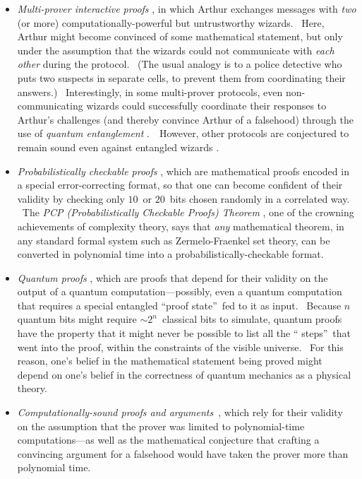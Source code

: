 \documentclass[11pt,onecolumn]{article}%
\begin{document}
\begin{itemize}
\item \textit{Multi-prover interactive proofs} \cite{bgkw,bfl}, in which
Arthur exchanges messages with \textit{two} (or more) computationally-powerful
but untrustworthy wizards. \ Here, Arthur might become convinced of some
mathematical statement, but only under the assumption that the wizards could
not communicate with \textit{each other} during the protocol. \ (The usual
analogy is to a police detective who puts two suspects in separate cells, to
prevent them from coordinating their answers.) \ Interestingly, in some
multi-prover protocols, even non-communicating wizards could successfully
coordinate their responses to Arthur's challenges (and thereby convince Arthur
of a falsehood) through the use of \textit{quantum entanglement}
\cite{chtw}.\ \ However, other protocols are conjectured to remain sound even
against entangled wizards \cite{kkmtv}.

\item \textit{Probabilistically checkable proofs} \cite{fglss,arorasafra},
which are mathematical proofs encoded in a special error-correcting format, so
that one can become confident of their validity by checking only $10$\ or
$20$\ bits chosen randomly in a correlated way. \ The \textit{PCP
(Probabilistically Checkable Proofs) Theorem} \cite{almss,dinur}, one of the
crowning achievements of complexity theory, says that \textit{any}
mathematical theorem, in any standard formal system such as Zermelo-Fraenkel
set theory, can be converted in polynomial time into a
probabilistically-checkable format.

\item \textit{Quantum proofs} \cite{watrous,ak}, which are proofs that depend
for their validity on the output of a quantum computation---possibly, even a
quantum computation that requires a special entangled \textquotedblleft proof
state\textquotedblright\ fed to it as input. \ Because $n$ quantum bits might
require $\sim2^{n}$\ classical bits to simulate, quantum proofs have the
property that it might never be possible to list all the \textquotedblleft
steps\textquotedblright\ that went into the proof, within the constraints of
the visible universe. \ For this reason, one's belief in the mathematical
statement being proved might depend on one's belief in the correctness of
quantum mechanics as a physical theory.

\item \textit{Computationally-sound proofs and arguments}\ \cite{bcc,micali},
which rely for their validity on the assumption that the prover was limited to
polynomial-time computations---as well as the mathematical conjecture that
crafting a convincing argument for a falsehood would have taken the prover
more than polynomial time.
\end{itemize}
\end{document}
